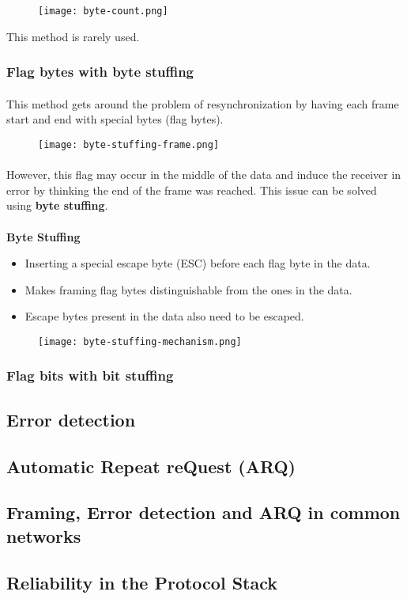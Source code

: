 \documentclass[../resumosRCOM.tex]{subfiles}
\begin{document}
\begin{figure}[h]
    \centering
    \texttt{[image: byte-count.png]}
\end{figure}

This method is rarely used.

\subsubsection{Flag bytes with byte stuffing}
\paragraph{}
This method gets around the problem of resynchronization by having each frame
start and end with special bytes (flag bytes).

\begin{figure}[h]
    \centering
    \texttt{[image: byte-stuffing-frame.png]}
\end{figure}

\paragraph{}
However, this flag may occur in the middle of the data and induce the receiver
in error by thinking the end of the frame was reached. This issue can be solved
using \textbf{byte stuffing}.

\paragraph{}
\textbf{Byte Stuffing}
\begin{itemize}
    \item Inserting a special escape byte (ESC) before each flag byte in 
    the data.
    \item Makes framing flag bytes distinguishable from the ones in the data.
    \item Escape bytes present in the data also need to be escaped.
\end{itemize}
 
\begin{figure}[h]
    \centering
    \texttt{[image: byte-stuffing-mechanism.png]}
\end{figure}

\subsubsection{Flag bits with bit stuffing}


\subsection{Error detection}
\subsection{Automatic Repeat reQuest (ARQ)}
\subsection{Framing, Error detection and ARQ in common networks}
\subsection{Reliability in the Protocol Stack}
\end{document}
